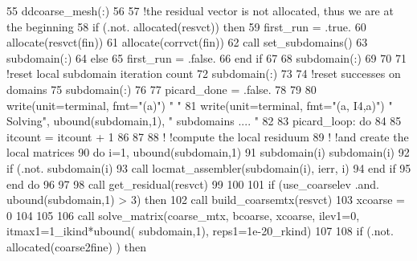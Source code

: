 \begin{DoxyCode}
55         ddcoarse_mesh(:)%
56         
57         \textcolor{comment}{!the residual vector is not allocated, thus we are at the beginning}
58         \textcolor{keywordflow}{if} (.not. \textcolor{keyword}{allocated}(resvct)) \textcolor{keywordflow}{then}
59           first\_run = .true.
60           \textcolor{keyword}{allocate}(resvct(fin))
61           \textcolor{keyword}{allocate}(corrvct(fin))          
62           \textcolor{keyword}{call }set_subdomains()
63           subdomain(:)%
64         \textcolor{keywordflow}{else}
65           first\_run = .false.
66 \textcolor{keywordflow}{        end if}
67 
68         subdomain(:)%
69 
70                 
71         \textcolor{comment}{!reset local subdomain iteration count}
72         subdomain(:)%
73 
74         \textcolor{comment}{!reset successes on domains}
75         subdomain(:)%
76         
77         picard\_done = .false.
78         
79 
80         \textcolor{keyword}{write}(unit=terminal, fmt=\textcolor{stringliteral}{"(a)"}) \textcolor{stringliteral}{"  "}
81         \textcolor{keyword}{write}(unit=terminal, fmt=\textcolor{stringliteral}{"(a, I4,a)"}) \textcolor{stringliteral}{" Solving"}, ubound(subdomain,1),  \textcolor{stringliteral}{" subdomains .... "}
82 
83         picard\_loop: \textcolor{keywordflow}{do}
84         
85           itcount = itcount + 1
86           
87 
88   \textcolor{comment}{!       !compute the local residuum}
89   \textcolor{comment}{!       !and create the local matrices}
90           \textcolor{keywordflow}{do} i=1, ubound(subdomain,1)
91             subdomain(i)%
      subdomain(i)%
92             \textcolor{keywordflow}{if} (.not. subdomain(i)%
93               \textcolor{keyword}{call }locmat_assembler(subdomain(i), ierr, i)
94 \textcolor{keywordflow}{            end if}
95 \textcolor{keywordflow}{          end do}
96 
97                   
98           \textcolor{keyword}{call }get_residual(resvct)
99 
100 
101           \textcolor{keywordflow}{if} (use_coarselev .and. ubound(subdomain,1) > 3) \textcolor{keywordflow}{then}
102             \textcolor{keyword}{call }build_coarsemtx(resvct)
103             xcoarse = 0
104 
105 
106             \textcolor{keyword}{call }solve_matrix(coarse_mtx, bcoarse, xcoarse, ilev1=0, itmax1=1\_ikind*ubound(
      subdomain,1), reps1=1e-20\_rkind)
107             
108             \textcolor{keywordflow}{if} (.not. \textcolor{keyword}{allocated}(coarse2fine) ) \textcolor{keywordflow}{then}

\end{DoxyCode}
